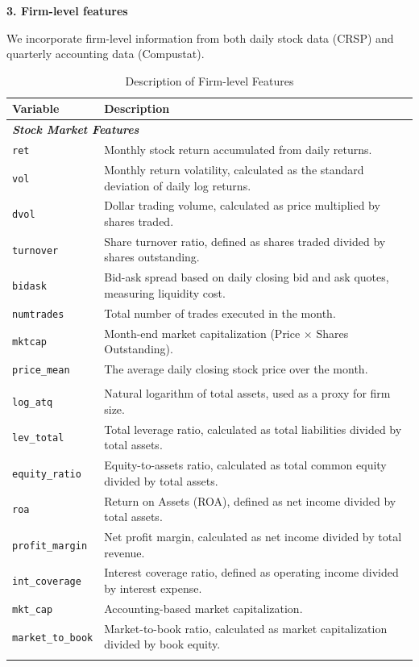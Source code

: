 \documentclass[12pt]{article}
\begin{document}
\textbf{3. Firm-level features}

We incorporate firm-level information from both daily stock data (CRSP) and quarterly accounting data (Compustat).

\begin{singlespace}
\begin{table}[H]
\centering
\caption{Description of Firm-level Features}
\label{tab:firm_features}
\begin{tabular}{l p{10cm}}
\toprule
\textbf{Variable} & \textbf{Description} \\
\midrule
\multicolumn{2}{l}{\textit{\textbf{Stock Market Features}}} \\
\texttt{ret} & Monthly stock return accumulated from daily returns. \\
\texttt{vol} & Monthly return volatility, calculated as the standard deviation of daily log returns. \\
\texttt{dvol} & Dollar trading volume, calculated as price multiplied by shares traded. \\
\texttt{turnover} & Share turnover ratio, defined as shares traded divided by shares outstanding. \\
\texttt{bidask} & Bid-ask spread based on daily closing bid and ask quotes, measuring liquidity cost. \\
\texttt{numtrades} & Total number of trades executed in the month. \\
\texttt{mktcap} & Month-end market capitalization (Price $\times$ Shares Outstanding). \\
\texttt{price\_mean} & The average daily closing stock price over the month. \\
\addlinespace

\multicolumn{2}{l}{\textit{\textbf{Accounting-Based Derived Indicators}}} \\
\texttt{log\_atq} & Natural logarithm of total assets, used as a proxy for firm size. \\
\texttt{lev\_total} & Total leverage ratio, calculated as total liabilities divided by total assets. \\
\texttt{equity\_ratio} & Equity-to-assets ratio, calculated as total common equity divided by total assets. \\
\texttt{roa} & Return on Assets (ROA), defined as net income divided by total assets. \\
\texttt{profit\_margin} & Net profit margin, calculated as net income divided by total revenue. \\
\texttt{int\_coverage} & Interest coverage ratio, defined as operating income divided by interest expense. \\
\texttt{mkt\_cap} & Accounting-based market capitalization. \\
\texttt{market\_to\_book} & Market-to-book ratio, calculated as market capitalization divided by book equity. \\
\addlinespace


\end{tabular}
\end{table}
\end{singlespace}
\end{document}

